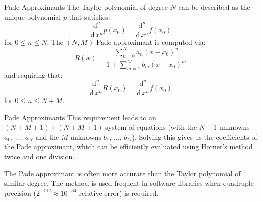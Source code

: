 \documentclass{beamer}
\begin{document}
    \begin{frame}{Pade Approximants}
        The Taylor polynomial of degree $N$ can be described as the unique
        polynomial $p$ that satisfies:
        \begin{equation}
            \frac{\textrm{d}^{n}}{\textrm{d}\,x^n}p(x_{0})=
            \frac{\textrm{d}^{n}}{\textrm{d}\,x^n}f(x_{0})
        \end{equation}
        for $0\leq{n}\leq{N}$. The $(N,M)$ Pade approximant is computed via:
        \begin{equation}
            R(x)=\frac{\sum_{n=0}^{N}a_{n}(x-x_{0})^{n}}
                {1+\sum_{m=1}^{M}b_{m}(x-x_{0})^{m}}
        \end{equation}
        and requiring that:
        \begin{equation}
            \frac{\textrm{d}^{n}}{\textrm{d}\,x^n}R(x_{0})=
            \frac{\textrm{d}^{n}}{\textrm{d}\,x^n}f(x_{0})
        \end{equation}
        for $0\leq{n}\leq{N+M}$.
    \end{frame}
    \begin{frame}{Pade Approximants}
        This requirement leads to an $(N+M+1)\times(N+M+1)$ system of equations
        (with the $N+1$ unknowns $a_{0},\,\dots,\,a_{N}$ and
        the $M$ unknowns $b_{1},\,\dots,\,b_{M}$). Solving this gives us the
        coefficients of the Pade approximant, which can be efficiently
        evaluated using Horner's method twice and one division.
        \par\hfill\par
        The Pade approximant is often more accurate than the Taylor polynomial
        of similar degree. The method is used frequent in software libraries
        when quadruple precision ($2^{-112}\approx{10}^{-34}$ relative error)
        is required.
    \end{frame}
\end{document}
